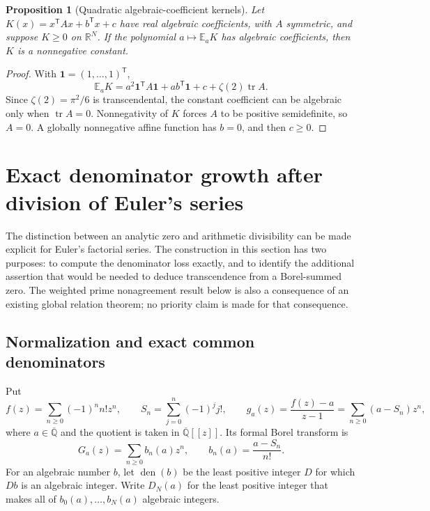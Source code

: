\documentclass[11pt,a4paper]{article}
\newcommand{\R}{\mathbb R}
\newcommand{\Qbar}{\overline{\mathbb Q}}
\newcommand{\E}{\mathbb E}
\newcommand{\tr}{\operatorname{tr}}
\newtheorem{proposition}[theorem]{Proposition}
\theoremstyle{definition}
\theoremstyle{remark}
\numberwithin{equation}{section}
\begin{document}
\begin{proposition}[Quadratic algebraic-coefficient kernels]
\label{at:sta:quadratic}
Let $K(x)=x^{\mathsf T}Ax+b^{\mathsf T}x+c$ have real algebraic
coefficients, with $A$ symmetric, and suppose $K\ge0$ on $\R^N$.
If the polynomial $a\mapsto\E_aK$ has algebraic coefficients, then
$K$ is a nonnegative constant.
\end{proposition}
\begin{proof}
With $\mathbf1=(1,\ldots,1)^{\mathsf T}$,
\[
 \E_aK=a^2\mathbf1^{\mathsf T}A\mathbf1
 +a b^{\mathsf T}\mathbf1+c+\zeta(2)\tr A.
\]
Since $\zeta(2)=\pi^2/6$ is transcendental, the constant coefficient
can be algebraic only when $\tr A=0$. Nonnegativity of $K$ forces
$A$ to be positive semidefinite, so $A=0$. A globally nonnegative
affine function has $b=0$, and then $c\ge0$.
\end{proof}

\section{Exact denominator growth after division of Euler's series}
\label{at:den:section}

The distinction between an analytic zero and arithmetic divisibility can be
made explicit for Euler's factorial series.  The construction in this section
has two purposes: to compute the denominator loss exactly, and to identify
the additional assertion that would be needed to deduce transcendence from
a Borel-summed zero.  The weighted prime nonagreement result below is also a
consequence of an existing global relation theorem; no priority claim is made
for that consequence.

\subsection{Normalization and exact common denominators}

Put
\begin{equation}\label{at:den:def-series}
 f(z)=\sum_{n\geq0}(-1)^n n!z^n,
 \qquad S_n=\sum_{j=0}^n(-1)^j j!,
 \qquad
 g_a(z)=\frac{f(z)-a}{z-1}
       =\sum_{n\geq0}(a-S_n)z^n,
\end{equation}
where $a\in\Qbar$ and the quotient is taken in $\Qbar[[z]]$.  Its formal
Borel transform is
\begin{equation}\label{at:den:borel}
 G_a(z)=\sum_{n\geq0}b_n(a)z^n,
 \qquad b_n(a)=\frac{a-S_n}{n!}.
\end{equation}
For an algebraic number $b$, let $\operatorname{den}(b)$ be the least positive
integer $D$ for which $Db$ is an algebraic integer.  Write $D_N(a)$ for the
least positive integer that makes all of $b_0(a),\ldots,b_N(a)$ algebraic
integers.
\end{document}

